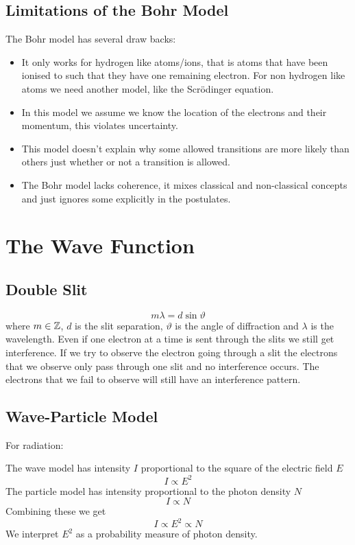 \documentclass{article}
\begin{document}
    \subsection{Limitations of the Bohr Model}
    The Bohr model has several draw backs:
    \begin{itemize}
        \item It only works for hydrogen like atoms/ions, that is atoms that have been ionised to such that they have one remaining electron.
        For non hydrogen like atoms we need another model, like the Scr\"odinger equation.
        \item In this model we assume we know the location of the electrons and their momentum, this violates uncertainty.
        \item This model doesn't explain why some allowed transitions are more likely than others just whether or not a transition is allowed.
        \item The Bohr model lacks coherence, it mixes classical and non-classical concepts and just ignores some explicitly in the postulates.
    \end{itemize}

    \section{The Wave Function}
    \subsection{Double Slit}
    \[m\lambda = d\sin\vartheta\]
    where \(m\in\mathbb{Z}\), \(d\) is the slit separation, \(\vartheta\) is the angle of diffraction and \(\lambda\) is the wavelength.
    Even if one electron at a time is sent through the slits we still get interference.
    If we try to observe the electron going through a slit the electrons that we observe only pass through one slit and no interference occurs.
    The electrons that we fail to observe will still have an interference pattern.
    
    \subsection{Wave-Particle Model}
    For radiation:
    
    The wave model has intensity \(I\) proportional to the square of the electric field \(E\)
    \[I\propto E^2\]
    The particle model has intensity proportional to the photon density \(N\)
    \[I\propto N\]
    Combining these we get
    \[I\propto E^2\propto N\]
    We interpret \(E^2\) as a probability measure of photon density.
    
\end{document}
